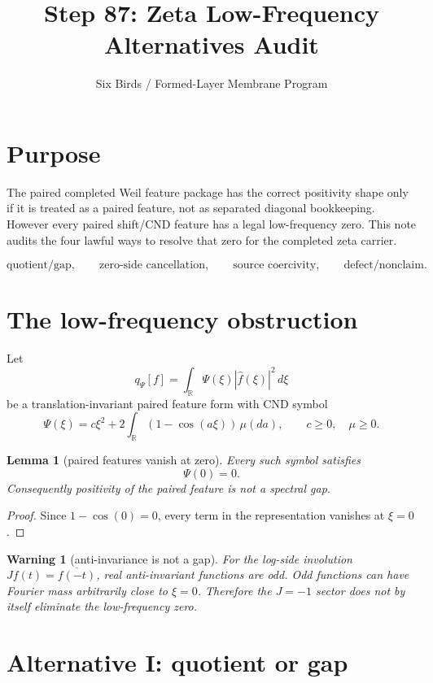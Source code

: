 \documentclass[11pt]{article}
\title{Step 87: Zeta Low-Frequency Alternatives Audit}
\author{Six Birds / Formed-Layer Membrane Program}
\date{}
\newtheorem{lemma}{Lemma}
\newtheorem{warning}{Warning}
\begin{document}
\maketitle

\section{Purpose}

The paired completed Weil feature package has the correct positivity shape only if it is treated as a paired feature, not as separated diagonal bookkeeping.  However every paired shift/CND feature has a legal low-frequency zero.  This note audits the four lawful ways to resolve that zero for the completed zeta carrier.

\[
\text{quotient/gap},\qquad
\text{zero-side cancellation},\qquad
\text{source coercivity},\qquad
\text{defect/nonclaim}.
\]

\section{The low-frequency obstruction}

Let
\[
q_\Psi[f]=\int_{\mathbb R}\Psi(\xi)|\widehat f(\xi)|^2\,d\xi
\]
be a translation-invariant paired feature form with CND symbol
\[
\Psi(\xi)=c\xi^2+2\int_{\mathbb R}(1-\cos(a\xi))\,\mu(da),
\qquad c\ge0,\quad \mu\ge0.
\]

\begin{lemma}[paired features vanish at zero]
Every such symbol satisfies
\[
\Psi(0)=0.
\]
Consequently positivity of the paired feature is not a spectral gap.
\end{lemma}

\begin{proof}
Since \(1-\cos(0)=0\), every term in the representation vanishes at \(\xi=0\).
\end{proof}

\begin{warning}[anti-invariance is not a gap]
For the log-side involution \(Jf(t)=\overline{f(-t)}\), real anti-invariant functions are odd.  Odd functions can have Fourier mass arbitrarily close to \(\xi=0\).  Therefore the \(J=-1\) sector does not by itself eliminate the low-frequency zero.
\end{warning}

\section{Alternative I: quotient or gap}
\end{document}
